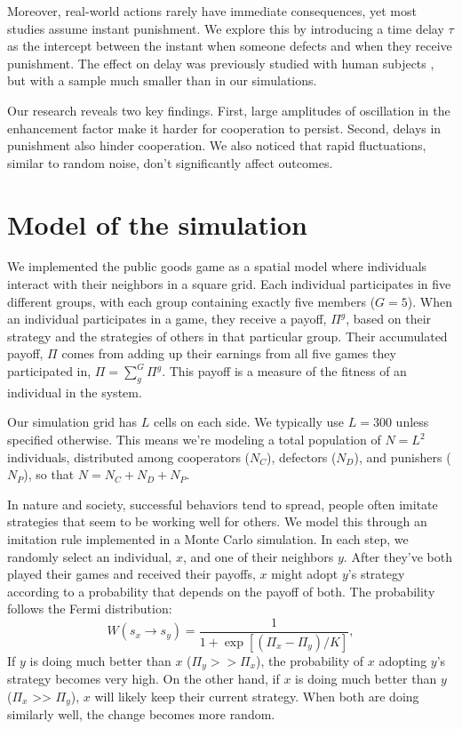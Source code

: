 Moreover, real-world actions rarely have immediate consequences, yet most studies assume instant punishment. We explore this by introducing a time delay $\tau$ as the intercept between the instant when someone defects and when they receive punishment. The effect on delay was previously studied with human subjects \cite{Late}, but with a sample much smaller than in our simulations.

Our research reveals two key findings. First, large amplitudes of oscillation in the enhancement factor make it harder for cooperation to persist. Second, delays in punishment also hinder cooperation. We also noticed that rapid fluctuations, similar to random noise, don't significantly affect outcomes.



\section{Model of the simulation}
\label{3model}




We implemented the public goods game as a spatial model where individuals interact with their neighbors in a square grid. Each individual participates in five different groups, with each group containing exactly five members ($G=5$). When an individual participates in a game, they receive a payoff, $\Pi^g$, based on their strategy and the strategies of others in that particular group. Their accumulated payoff, $\Pi$ comes from adding up their earnings from all five games they participated in, $\Pi=\sum_g^G \Pi^g$. This payoff is a measure of the fitness of an individual in the system.

Our simulation grid has $L$ cells on each side. We typically use $L=300$ unless specified otherwise. This means we're modeling a total population of $N=L^2$ individuals, distributed among cooperators ($N_C$), defectors ($N_D$), and punishers ($N_P$), so that $N=N_C+N_D+N_P$.

In nature and society, successful behaviors tend to spread, people often imitate strategies that seem to be working well for others. We model this through an imitation rule implemented in a Monte Carlo simulation. In each step, we randomly select an individual, $x$, and one of their neighbors $y$. After they've both played their games and received their payoffs, $x$ might adopt $y$'s strategy according to a probability that depends on the payoff of both. The probability follows the Fermi distribution:
\begin{equation}
W(s_x \rightarrow s_y)=\frac{1}{1+\exp[(\Pi_{x}-\Pi_{y})/K]},
\end{equation}
If $y$ is doing much better than $x$ ($\Pi_y >> \Pi_x$), the probability of $x$ adopting $y$'s strategy becomes very high. On the other hand, if $x$ is doing much better than $y$ ($\Pi_x$ >> $\Pi_y$), $x$ will likely keep their current strategy. When both are doing similarly well, the change becomes more random.

